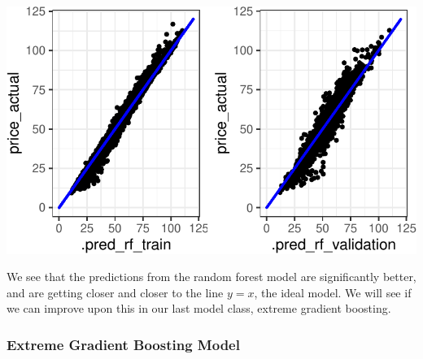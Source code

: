 \documentclass[
]{article}
\begin{document}
\includegraphics{Analytics_Report_files/figure-pdf/plotRf-1.pdf}

We see that the predictions from the random forest model are
significantly better, and are getting closer and closer to the line
\(y = x\), the ideal model. We will see if we can improve upon this in
our last model class, extreme gradient boosting.

\subsubsection{Extreme Gradient Boosting
Model}\label{extreme-gradient-boosting-model}
\end{document}
